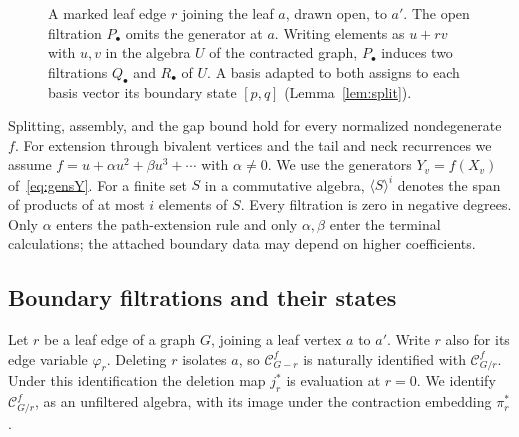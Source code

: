 \documentclass[reqno]{article}
\theoremstyle{plain} %
\theoremstyle{definition}
\theoremstyle{remark}
\newcommand {\CC}{\mathscr{C}}
\numberwithin{equation}{section}
\begin{document}
\begin{figure}[htbp]
\centering
{}
\caption{A marked leaf edge $r$ joining the leaf $a$, drawn open, to
$a'$. The open filtration $P_\bullet$ omits the generator at $a$. Writing
elements as $u+rv$ with $u,v$ in the algebra $U$ of the contracted graph,
$P_\bullet$ induces two filtrations $Q_\bullet$ and $R_\bullet$ of $U$.
A basis adapted to both assigns to each basis vector its boundary state
$[p,q]$ (Lemma~\ref{lem:split}).}
\label{fig:boundary-state}
\end{figure}

Splitting, assembly, and the gap bound hold for every normalized
nondegenerate $f$. For extension through bivalent vertices and the tail and neck
recurrences we assume $f=u+\alpha u^2+\beta u^3+\cdots$ with
$\alpha\ne0$. We use the generators $Y_v=f(X_v)$ of~\eqref{eq:gensY}.
For a finite set $S$ in a commutative algebra, $\langle S\rangle^i$
denotes the span of products of at most $i$ elements of $S$.
Every filtration is zero in negative degrees. Only $\alpha$ enters
the path-extension rule and only $\alpha,\beta$ enter the terminal
calculations; the attached boundary data may depend on higher coefficients.

\subsection{Boundary filtrations and their states}
\label{sec:split}

Let \(r\) be a leaf edge of a graph \(G\), joining a leaf vertex \(a\) to
\(a'\). Write \(r\) also for its edge variable \(\varphi_r\). Deleting
\(r\) isolates \(a\), so \(\CC^f_{G-r}\) is naturally identified with
\(\CC^f_{G/r}\). Under this identification the deletion map
\(j_r^*\) is evaluation at \(r=0\). We identify \(\CC^f_{G/r}\), as an
unfiltered algebra, with its image under the contraction embedding
\(\pi_r^*\).
\end{document}
